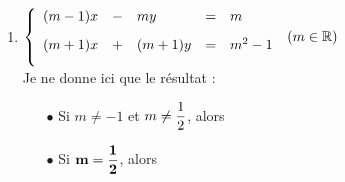 \documentclass[a4paper, 11pt,reqno]{article}
\begin{document}
\begin{correction}
\begin{enumerate}
\begin{itemize}
\item[$\bullet$] Si $m=-1$r, on reprend le syst\`eme $(S^{\prime\prime})$ (on reprend au niveau o\`u on a d\^u faire l'hypoth\`ese de non \'egalit\'e) et on obtient :
$$\left\lbrace\begin{array}{lllllll}
x&+&y&+&z&=&-2\vsec\\
&&2y&&&=&0\vsec\\
&& &&0&=&-4.
\end{array}\right.$$
La derni\`ere \'equation n'a pas de solution, donc on a : 
\item[$\bullet$]  Si $m=0$, on obtient :
$$\left\lbrace\begin{array}{lllllll}
x&&&&&=&0\vsec\\
&&y&&&=&1\vsec\\
&& &&0&=&0.
\end{array}\right.
$$
Le syst\`eme est de rang $2$, et a pour solutions : 
\item[$\bullet$]  Si $m=1$, on obtient :
$$\left\lbrace\begin{array}{rrrrrrr}
x&-&y&+&z&=&2\vsec\\
&&2y&-&2z&=&-2\vsec\\
&& &&0&=&0.
\end{array}\right.
\Leftrightarrow
\left\lbrace\begin{array}{rrrrrrr}
x&=&2-z-1+z\vsec\\
y&=&-1+z
\end{array}\right.
$$
Le syst\`eme est de rang $2$, et a pour solutions : 
\end{itemize}
\vsec
\item 
$\left\lbrace\begin{array}{lllll}
(m-1)x & - & my & = & m\vsec\\
(m+1)x & + & (m+1)y & = & m^2-1\vsec\\
\end{array}\right.$    $(m\in\mathbb{R})$\vsec\\
Je ne donne ici que le r\'esultat :\vsec
\begin{itemize}
\item[$\bullet$]   Si $m\not= -1$ et $m\not= \displaystyle\frac{1}{2}$, alors 
\item[$\bullet$]  Si $\mathbf{m=\displaystyle\frac{1}{2}}$, alors 

\end{itemize}
\end{enumerate}
\end{correction}
\end{document}

